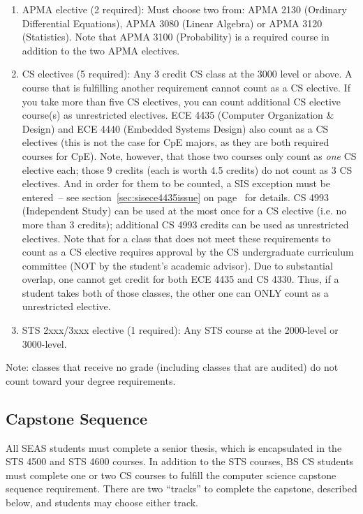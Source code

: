 \documentclass[10pt,letter]{book}
\begin{document}
\begin{enumerate}
\item APMA elective (2 required): Must choose two from: APMA 2130
  (Ordinary Differential Equations), APMA 3080 (Linear
  Algebra) or APMA 3120 (Statistics). Note that APMA 3100
  (Probability) is a required course in addition to the two APMA
  electives.

\item CS electives (5 required): Any 3 credit CS class at the 3000
  level or above. A course that is fulfilling another requirement
  cannot count as a CS elective. If you take more than five CS
  electives, you can count additional CS elective course(s) as
  unrestricted electives. ECE 4435 (Computer Organization \&
  Design) and ECE 4440 (Embedded Systems Design) also count as a
  CS electives (this is not the case for CpE majors, as they are both
  required courses for CpE). Note, however, that those two courses
  only count as {\em one} CS elective each; those 9 credits (each is
  worth 4.5 credits) do not count as 3 CS electives.  And in order for
  them to be counted, a SIS exception must be entered~-- see
  section~\ref{sec:sisece4435issue} on
  page~\pageref{sec:sisece4435issue} for details.  CS 4993
  (Independent Study) can be used at the most once for a CS elective
  (i.e. no more than 3 credits); additional CS 4993 credits can
  be used as unrestricted electives. Note that for a class that does
  not meet these requirements to count as a CS elective requires
  approval by the CS undergraduate curriculum committee (NOT by the
  student's academic advisor). Due to substantial overlap, one cannot
  get credit for both ECE 4435 and CS 4330. Thus, if a
  student takes both of those classes, the other one can ONLY count as
  a unrestricted elective.

\item STS 2xxx/3xxx elective (1 required): Any STS course at the
  2000-level or 3000-level.
\end{enumerate}
 
Note: classes that receive no grade (including classes that are
audited) do not count toward your degree requirements.

\subsection{Capstone Sequence}
\label{capstone-section}

All SEAS students must complete a senior thesis, which is encapsulated
in the STS 4500 and STS 4600 courses.  In addition to the STS courses,
BS CS students must complete one or two CS courses to fulfill the
computer science capstone sequence requirement.  There are two
``tracks'' to complete the capstone, described below, and students may
choose either track.
\end{document}
